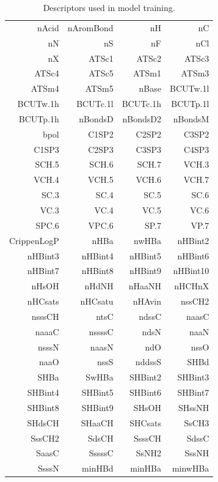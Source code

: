 \documentclass[]{article}
\begin{document}
\begin{table}[htbp]\footnotesize
  \centering
  \caption{Descriptors used in model training.}
    \begin{tabular}{rrrr}
    \toprule
    nAcid & nAromBond & nH    & nC \\
    nN    & nS    & nF    & nCl \\
    nX    & ATSc1 & ATSc2 & ATSc3 \\
    ATSc4 & ATSc5 & ATSm1 & ATSm3 \\
    ATSm4 & ATSm5 & nBase & BCUTw.1l \\
    BCUTw.1h & BCUTc.1l & BCUTc.1h & BCUTp.1l \\
    BCUTp.1h & nBondsD & nBondsD2 & nBondsM \\
    bpol  & C1SP2 & C2SP2 & C3SP2 \\
    C1SP3 & C2SP3 & C3SP3 & C4SP3 \\
    SCH.5 & SCH.6 & SCH.7 & VCH.3 \\
    VCH.4 & VCH.5 & VCH.6 & VCH.7 \\
    SC.3  & SC.4  & SC.5  & SC.6 \\
    VC.3  & VC.4  & VC.5  & VC.6 \\
    SPC.6 & VPC.6 & SP.7  & VP.7 \\
    CrippenLogP & nHBa  & nwHBa & nHBint2 \\
    nHBint3 & nHBint4 & nHBint5 & nHBint6 \\
    nHBint7 & nHBint8 & nHBint9 & nHBint10 \\
    nHsOH & nHdNH & nHaaNH & nHCHnX \\
    nHCsats & nHCsatu & nHAvin & nssCH2 \\
    nsssCH & ntsC  & ndssC & naasC \\
    naaaC & nssssC & ndsN  & naaN \\
    nsssN & naasN & ndO   & nssO \\
    naaO  & nssS  & nddssS & SHBd \\
    SHBa  & SwHBa & SHBint2 & SHBint3 \\
    SHBint4 & SHBint5 & SHBint6 & SHBint7 \\
    SHBint8 & SHBint9 & SHsOH & SHssNH \\
    SHdsCH & SHaaCH & SHCsats & SsCH3 \\
    SssCH2 & SdsCH & SsssCH & SdssC \\
    SaasC & SssssC & SsNH2 & SssNH \\
    SsssN & minHBd & minHBa & minwHBa \\

\end{tabular}
\end{table}
\end{document}
